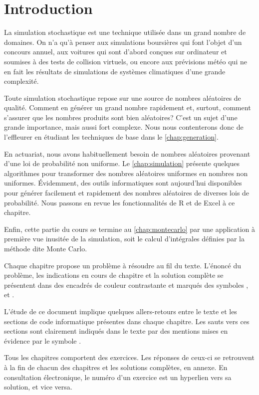 \chapter*{Introduction}

La simulation stochastique est une technique utilisée dans un grand
nombre de domaines. On n'a qu'à penser aux simulations boursières qui
font l'objet d'un concours annuel, aux voitures qui sont d'abord
conçues sur ordinateur et soumises à des tests de collision virtuels,
ou encore aux prévisions météo qui ne en fait les résultats de
simulations de systèmes climatiques d'une grande complexité.

Toute simulation stochastique repose sur une source de nombres
aléatoires de qualité. Comment en générer un grand nombre rapidement
et, surtout, comment s'assurer que les nombres produits sont bien
aléatoires? C'est un sujet d'une grande importance, mais aussi fort
complexe. Nous nous contenterons donc de l'effleurer en étudiant les
techniques de base dans le \autoref{chap:generation}.

En actuariat, nous avons habituellement besoin de nombres aléatoires
provenant d'une loi de probabilité non uniforme. Le
\autoref{chap:simulation} présente quelques algorithmes pour
transformer des nombres aléatoires uniformes en nombres non uniformes.
Évidemment, des outils informatiques sont aujourd'hui disponibles pour
générer facilement et rapidement des nombres aléatoires de diverses
lois de probabilité. Nous passons en revue les fonctionnalités de R et
de Excel à ce chapitre.

Enfin, cette partie du cours se termine au
\autoref{chap:montecarlo} par une application à première vue
inusitée de la simulation, soit le calcul d'intégrales définies par la
méthode dite Monte Carlo.

Chaque chapitre propose un problème à résoudre au fil du texte.
L'énoncé du problème, les indications en cours de chapitre et la
solution complète se présentent dans des encadrés de couleur
contrastante et marqués des symboles {\faCogs}, {\faBolt} et
{\faLightbulbO}.

L'étude de ce document implique quelques allers-retours entre le texte
et les sections de code informatique présentes dans chaque chapitre.
Les sauts vers ces sections sont clairement indiqués dans le texte par
des mentions mises en évidence par le symbole {\faMapSigns}.

Tous les chapitres comportent des exercices. Les réponses de ceux-ci se
retrouvent à la fin de chacun des chapitres et les solutions complètes,
en annexe. En consultation électronique, le numéro d'un exercice est
un hyperlien vers sa solution, et vice versa.

